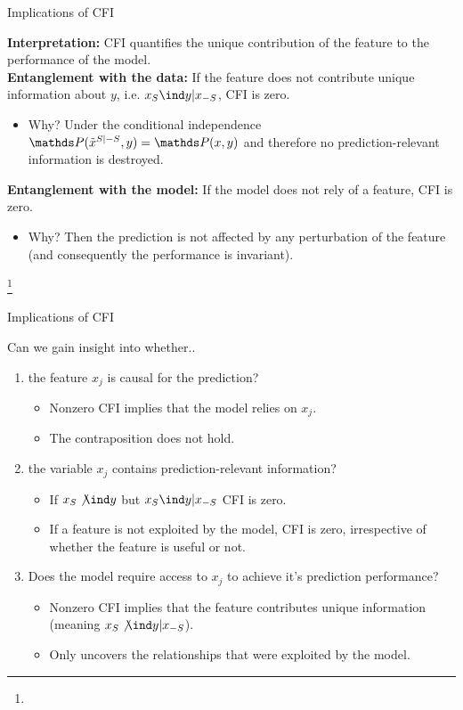 \documentclass[11pt,compress,t,notes=noshow, xcolor=table]{beamer}
\begin{document}
\begin{vbframe}{Implications of CFI}

\textbf{Interpretation:} CFI quantifies the unique contribution of the feature to the performance of the model.\\
\lz
\textbf{Entanglement with the data:} If the feature does not contribute unique information about $y$, i.e. $x_S \ind y | x_{-S}$, CFI is zero.\\
\begin{itemize}
  \item Why? Under the conditional independence $\P(\pert{x}{S}{-S}, y) = \P(x,y)$ and therefore no prediction-relevant information is destroyed.
\end{itemize}
\lz
\textbf{Entanglement with the model:} If the model does not rely of a feature, CFI is zero.\\
\begin{itemize}
  \item Why? Then the prediction is not affected by any perturbation of the feature (and consequently the performance is invariant).
\end{itemize}

\footnote[frame]{}
\end{vbframe}


\begin{vbframe}{Implications of CFI}

Can we gain insight into whether..

\begin{enumerate}
    \item the feature $x_j$ is causal for the prediction?
    \begin{itemize}
      \item Nonzero CFI implies that the model relies on $x_j$.
      \item The contraposition does not hold.
    \end{itemize}
    \item the variable $x_j$ contains prediction-relevant information?
    \begin{itemize}
      \item If $x_S \not \ind y$ but $x_S \ind y | x_{-S}$ CFI is zero.
      \item If a feature is not exploited by the model, CFI is zero, irrespective of whether the feature is useful or not.
    \end{itemize}
    \item Does the model require access to $x_j$ to achieve it's prediction performance?
\begin{itemize}
      \item Nonzero CFI implies that the feature contributes unique information (meaning $x_S \not \ind y | x_{-S}$).
      \item Only uncovers the relationships that were exploited by the model.
    \end{itemize}
\end{enumerate}
\end{vbframe}

\begin{vbframe}
  \printbibliography
\end{vbframe}

\endlecture
\end{document}
